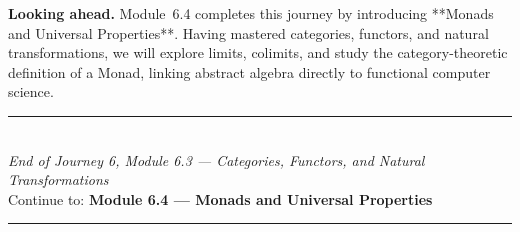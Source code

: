 \documentclass[12pt, a4paper]{article}
\begin{document}
\medskip
\noindent\textbf{Looking ahead.}
Module~6.4 completes this journey by introducing **Monads and Universal Properties**. Having mastered categories, functors, and natural transformations, we will explore limits, colimits, and study the category-theoretic definition of a Monad, linking abstract algebra directly to functional computer science.

\vspace{1.4cm}
\begin{center}
{\color{NavyBlue}\rule{0.5\linewidth}{0.8pt}}\\[6pt]
{\small\color{NavyBlue}\textit{End of Journey 6, Module 6.3 --- Categories, Functors, and Natural Transformations}}\\[4pt]
{\small\color{NavyBlue}Continue to: \textbf{Module 6.4 --- Monads and Universal Properties}}\\[6pt]
{\color{NavyBlue}\rule{0.5\linewidth}{0.8pt}}
\end{center}
\end{document}
